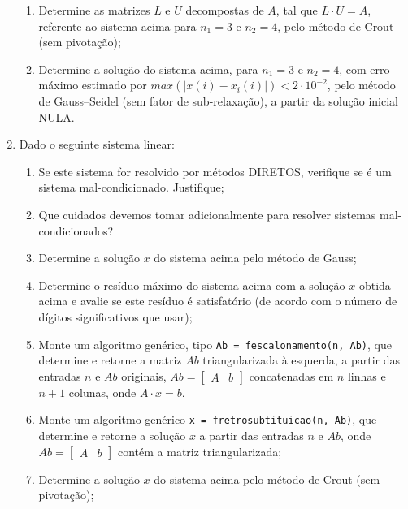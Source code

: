 \documentclass[12pt]{article}
\newenvironment{smallitem}{
    \vspace{-2mm}
    \begin{enumerate}
    \setlength{\parskip}{0pt}
    \setlength{\itemsep}{2pt}
}{
    \vspace{-2mm}
    \end{enumerate}
}
\begin{document}
\begin{enumerate}[label=\textbf{\arabic*})]
\begin{smallitem}
\item Determine as matrizes $L$ e $U$ decompostas de $A$, tal que $L \cdot U =
A$, referente ao sistema acima para $n_1 = 3$ e $n_2 = 4$, pelo método de Crout
(sem pivotação);

\item Determine a solução do sistema acima, para $n_1 = 3$ e $n_2 = 4$, com erro
máximo estimado por $max(\vert x(i)- x_i(i) \vert) < 2 \cdot 10^{-2}$, pelo
método de Gauss--Seidel (sem fator de sub-relaxação), a partir da solução
inicial NULA.

\end{smallitem}

\item Dado o seguinte sistema linear:

\begin{smallitem}

\item Se este sistema for resolvido por métodos DIRETOS, verifique se é um
sistema mal-condicionado. Justifique;

\item Que cuidados devemos tomar adicionalmente para resolver sistemas mal-
condicionados?

\item Determine a solução $x$ do sistema acima pelo método de Gauss;

\item Determine o resíduo máximo do sistema acima com a solução $x$ obtida acima
e avalie se este resíduo é satisfatório (de acordo com o número de dígitos
significativos que usar);

\item Monte um algoritmo genérico, tipo \verb!Ab = fescalonamento(n, Ab)!, que
determine e retorne a matriz $Ab$ triangularizada à esquerda, a partir das
entradas $n$ e $Ab$ originais, $Ab = \begin{bmatrix} A & b \end{bmatrix}$
concatenadas em $n$ linhas e $n + 1$ colunas, onde $A \cdot x = b$.

\item Monte um algoritmo genérico \verb!x = fretrosubtituicao(n, Ab)!, que
determine e retorne a solução $x$ a partir das entradas $n$ e $Ab$, onde
$Ab = \begin{bmatrix} A & b \end{bmatrix}$ contém a matriz triangularizada;

\item Determine a solução $x$ do sistema acima pelo método de Crout (sem
pivotação);


\end{smallitem}
\end{enumerate}
\end{document}

